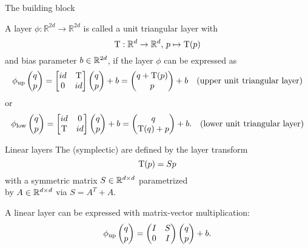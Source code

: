 \begin{frame}{The building block}
  \begin{definition}
    A layer $\phi : \mathbb{R}^{2d} \to \mathbb{R}^{2d}$ 
    is called a unit triangular layer with 
    \begin{equation*}
      \mathrm{T} : \mathbb{R}^d \to \mathbb{R}^d,\, p \mapsto \mathrm{T}(p)
    \end{equation*}
    and bias parameter $b \in \mathbb{R}^{2d}$, if the layer $\phi$ can be expressed as
    \begin{equation*}
      \phi_{\text{up}} \begin{pmatrix} q \\ p \end{pmatrix} = \begin{bmatrix} id & {\mathrm{T}} \\ 0 & id \end{bmatrix} \begin{pmatrix} q \\ p \end{pmatrix} + b
      = \begin{pmatrix}
        q + \mathrm{T}(p) \\
        p
      \end{pmatrix} + b \quad \text{(upper unit triangular layer)}
    \end{equation*}
    or
    \begin{equation*}
      \phi_{\text{low}} \begin{pmatrix} q \\ p \end{pmatrix} = \begin{bmatrix} id & 0 \\ {\mathrm{T}} & id \end{bmatrix} \begin{pmatrix} q \\ p \end{pmatrix} + b
      = \begin{pmatrix}
        q \\
        \mathrm{T}(q) + p
      \end{pmatrix} + b. \quad \text{(lower unit triangular layer)}
    \end{equation*}
  \end{definition}

\end{frame}

\begin{frame}[c]{Linear layers}
  The (symplectic)  are defined by the layer transform
  \begin{equation*}
    \mathrm{T}(p) = Sp
  \end{equation*}
  with a symmetric matrix $S \in \mathbb{R}^{d \times d}$ parametrized\\
  by $A \in \mathbb{R}^{d \times d}$ via $S=A^T+A$.
  \vspace{1cm}

  A linear layer can be expressed with matrix-vector multiplication:
  \begin{equation*}
    \phi_{\text{up}} \begin{pmatrix} q \\ p \end{pmatrix} = \begin{pmatrix}
      I & S \\
      0 & I
    \end{pmatrix} \begin{pmatrix} q \\ p \end{pmatrix} + b
    .
  \end{equation*}
\end{frame}

